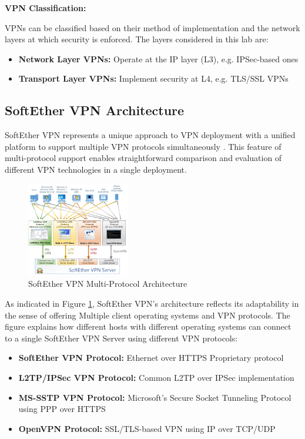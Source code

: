 \noindent
\textbf{VPN Classification:}

\noindent
VPNs can be classified based on their method of implementation and the network layers at which security is enforced. The layers considered in this lab are:

\begin{itemize}
    \item \textbf{Network Layer VPNs:} Operate at the IP layer (L3), e.g. IPSec-based ones
    \item \textbf{Transport Layer VPNs:} Implement security at L4, e.g. TLS/SSL VPNs
\end{itemize}

\subsection{SoftEther VPN Architecture}

SoftEther VPN represents a unique approach to VPN deployment with a unified platform to support multiple VPN protocols simultaneously \cite{softether_official}. This feature of multi-protocol support enables straightforward comparison and evaluation of different VPN technologies in a single deployment.

\begin{figure}[H]
\centering
\includegraphics[width=0.4\textwidth]{../resources/Images/SoftEther_VPN_Architecture.jpg}
\caption{SoftEther VPN Multi-Protocol Architecture}
\label{fig:softether_architecture}
\end{figure}

As indicated in Figure \ref{fig:softether_architecture}, SoftEther VPN's architecture reflects its adaptability in the sense of offering Multiple client operating systems and VPN protocols. The figure explains how different hosts with different operating systems can connect to a single SoftEther VPN Server using different VPN protocols:

\begin{itemize}
    \item \textbf{SoftEther VPN Protocol:} Ethernet over HTTPS Proprietary protocol
    \item \textbf{L2TP/IPSec VPN Protocol:} Common L2TP over IPSec implementation
    \item \textbf{MS-SSTP VPN Protocol:} Microsoft's Secure Socket Tunneling Protocol using PPP over HTTPS
    \item \textbf{OpenVPN Protocol:} SSL/TLS-based VPN using IP over TCP/UDP
\end{itemize}

